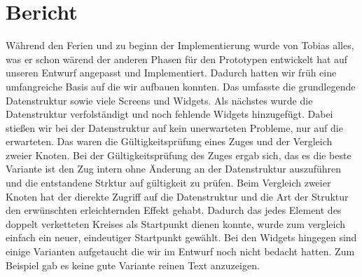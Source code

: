\chapter{Bericht}
Während den Ferien und zu beginn der Implementierung wurde von Tobias alles,
was er schon wärend der anderen Phasen für den Prototypen entwickelt hat
auf unseren Entwurf angepasst und Implementiert.
Dadurch hatten wir früh eine umfangreiche Basis auf die wir aufbauen konnten.
Das umfasste die grundlegende Datenstruktur sowie viele Screens und Widgets.
Als nächstes wurde die Datenstruktur verfolständigt und noch fehlende Widgets hinzugefügt.
Dabei stießen wir bei der Datenstruktur auf kein unerwarteten Probleme, nur auf die erwarteten.
Das waren die Gültigkeitsprüfung eines Zuges und der Vergleich zweier Knoten.
Bei der Gültigkeitsprüfung des Zuges ergab sich, das es die beste Variante ist den Zug intern ohne Änderung an der Datenstruktur auszuführen und die entstandene Strktur auf gültigkeit zu prüfen.
Beim Vergleich zweier Knoten hat der dierekte Zugriff auf die Datenstruktur und die Art der Struktur den erwünschten erleichternden Effekt gehabt. Dadurch das jedes Element des doppelt verketteten Kreises als Startpunkt dienen konnte, wurde zum vergleich einfach ein neuer, eindeutiger Startpunkt gewählt.
Bei den Widgets hingegen sind einige Varianten aufgetaucht die wir im Entwurf noch nicht bedacht hatten. Zum Beispiel gab es keine gute Variante reinen Text anzuzeigen.
